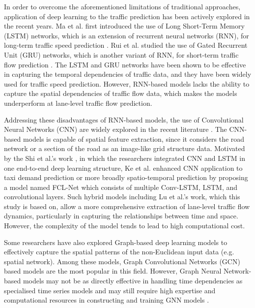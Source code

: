 \documentclass[11pt]{uonthesis}
\begin{document}
In order to overcome the aforementioned limitations of traditional approaches, application of deep learning to the traffic prediction has been actively explored in the recent years. Ma et al. first introduced the use of Long Short-Term Memory (LSTM) networks, which is an extension of recurrent neural networks (RNN), for long-term traffic speed prediction \cite{ma2015lstm}. Rui et al. studied the use of Gated Recurrent Unit (GRU) networks, which is another variant of RNN, for short-term traffic flow prediction \cite{rui2017gru}. The LSTM and GRU networks have been shown to be effective in capturing the temporal dependencies of traffic data, and they have been widely used for traffic speed prediction. However, RNN-based models lacks the ability to capture the spatial dependencies of traffic flow data, which makes the models underperform at lane-level traffic flow prediction. 

Addressing these disadvantages of RNN-based models, the use of Convolutional Neural Networks (CNN) are widely explored in the recent literature \cite{macnnimage}\cite{cnnzhang}. The CNN-based models is capable of spatial feature extraction, since it considers the road network or a section of the road as an image-like grid structure data. Motivated by the Shi et al.'s work \cite{convlstm}, in which the researchers integrated CNN and LSTM in one end-to-end deep learning structure, Ke et al. \cite{FCL} enhanced CNN application to taxi demand prediction or more broadly spatio-temporal prediction by proposing a model named FCL-Net which consists of multiple Conv-LSTM, LSTM, and convolutional layers. Such hybrid models including Lu et al.'s work, which this study is based on, allow a more comprehensive extraction of lane-level traffic flow dynamics, particularly in capturing the relationships between time and space. However, the complexity of the model tends to lead to high computational cost.

Some researchers have also explored Graph-based deep learning models to effectively capture the spatial patterns of the non-Euclidean input data (e.g. spatial network). Among these models, Graph Convolutional Networks (GCN) based models \cite{gcn1}\cite{gcn2}\cite{agafonov} are the most popular in this field. However, Graph Neural Network-based models may not be as directly effective in handling time dependencies as specialised time series models and may still require high expertise and computational resources in constructing and training GNN models \cite{li2024unifyinglaneleveltrafficprediction}.  
\end{document}
